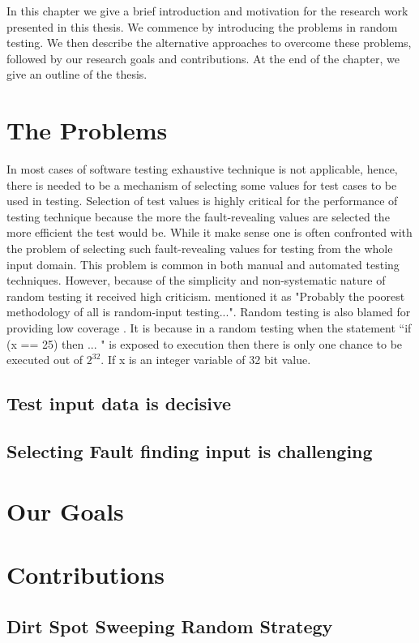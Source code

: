 In this chapter we give a brief introduction and motivation for the research work presented in this thesis. We commence by introducing the problems in random testing. We then describe the alternative approaches to overcome these problems, followed by our research goals and contributions. At the end of the chapter, we give an outline of the thesis.

\section{The Problems}
In most cases of software testing exhaustive technique is not applicable, hence, there is needed to be a mechanism of selecting some values for test cases to be used in testing. Selection of test values is highly critical for the performance of testing technique because the more the fault-revealing values are selected the more efficient the test would be. While it make sense one is often confronted with the problem of selecting such fault-revealing values for testing from the whole input domain. This problem is common in both manual and automated testing techniques. However, because of the simplicity and non-systematic nature of random testing it received high criticism. \cite{Myers2004} mentioned it as "Probably the poorest methodology of all is random-input testing...". Random testing is also blamed for providing low coverage \cite{Offutt1996}. It is because in a random testing when the statement  ``if (x == 25) then ... "  is exposed to execution then there is only one chance to be executed out of $2^\text{32}$. If x is an integer variable of 32 bit value. \cite{Godefroid2005}


\subsection{Test input data is decisive}
\subsection{Selecting Fault finding input is challenging}

\section{Our Goals}

\section{Contributions}
\subsection{Dirt Spot Sweeping Random Strategy}
